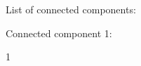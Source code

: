 \documentclass{article}
\begin{document}
List of connected components:

Connected component 1: 

1
\end{document}
